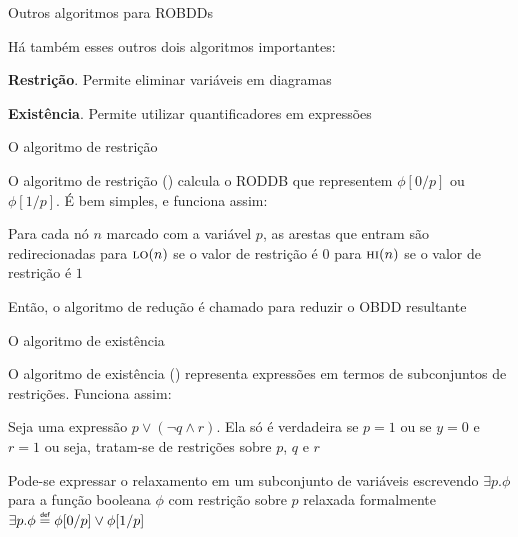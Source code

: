 \expandafter\documentclass\expandafter[table, usenames, svgnames, dvipsnames,14pt, \classopts]{beamer}
\newcommand\defeq{\mathrel{\overset{\makebox[0pt]{\mbox{\normalfont\tiny\sffamily def}}}{=}}}
\begin{document}
\begin{frame}{Outros algoritmos para ROBDDs}

    Há também esses outros dois algoritmos importantes:
    
    \begin{outline}
        \1 \textbf{Restrição}. Permite eliminar variáveis em diagramas
            
        \1 \textbf{Existência}. Permite utilizar quantificadores em expressões
    \end{outline}

\end{frame}

\begin{frame}{O algoritmo de restrição}

    \small
    O algoritmo de restrição () calcula o RODDB que representem $\phi[0/p]$ ou $\phi[1/p]$. É bem simples, e funciona assim:

    \begin{outline}
        \1 Para cada nó $n$ marcado com a variável $p$, as arestas que entram são redirecionadas
            \2[-] para $\Call{lo}{n}$ se o valor de restrição é $0$
            \2[-] para $\Call{hi}{n}$ se o valor de restrição é $1$
            
        \vspace{1em}
            
        \1 Então, o algoritmo de redução é chamado para reduzir o OBDD resultante
        
    \end{outline}

\end{frame}

\begin{frame}{O algoritmo de existência}

    \small
    O algoritmo de existência () representa expressões em termos de subconjuntos de restrições. Funciona assim:

    \begin{outline}
        \1 Seja uma expressão $p \lor (\lnot{q} \land r)$. Ela só é verdadeira se $p = 1$ ou se $y = 0$ e $r = 1$
            \2[-] ou seja, tratam-se de restrições sobre $p$, $q$ e $r$
            
        \vspace{1em}
            
        \1 Pode-se expressar o relaxamento em um subconjunto de variáveis
            \2[-] escrevendo $\exists{p.\phi}$ para a função booleana $\phi$ com restrição sobre $p$ relaxada
            \2[-] formalmente $\exists{p.\phi} \defeq \phi[0/p] \lor \phi[1/p]$
        
    \end{outline}

\end{frame}
\end{document}
